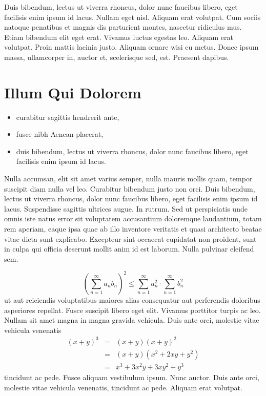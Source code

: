 Duis bibendum, lectus ut viverra rhoncus, dolor nunc faucibus libero, eget facilisis enim ipsum id lacus. Nullam eget nisl. Aliquam erat volutpat. Cum sociis natoque penatibus et magnis dis parturient montes, nascetur ridiculus mus. Etiam bibendum elit eget erat. Vivamus luctus egestas leo. Aliquam erat volutpat. Proin mattis lacinia justo. Aliquam ornare wisi eu metus. Donec ipsum massa, ullamcorper in, auctor et, scelerisque sed, est. Praesent dapibus.

\section{Illum Qui Dolorem}
\begin{itemize}
	\item curabitur sagittis hendrerit ante,
	\item fusce nibh Aenean placerat,
	\item duis bibendum, lectus ut viverra rhoncus, dolor nunc faucibus libero, eget facilisis enim ipsum id lacus.
\end{itemize}
Nulla accumsan, elit sit amet varius semper, nulla mauris mollis quam, tempor suscipit diam nulla vel leo. Curabitur bibendum justo non orci. Duis bibendum, lectus ut viverra rhoncus, dolor nunc faucibus libero, eget facilisis enim ipsum id lacus. Suspendisse sagittis ultrices augue. In rutrum. Sed ut perspiciatis unde omnis iste natus error sit voluptatem accusantium doloremque laudantium, totam rem aperiam, eaque ipsa quae ab illo inventore veritatis et quasi architecto beatae vitae dicta sunt explicabo. Excepteur sint occaecat cupidatat non proident, sunt in culpa qui officia deserunt mollit anim id est laborum. Nulla pulvinar eleifend sem.

\begin{equation}
\left(\sum_{n=1}^{\infty}a_{n}b_{n}\right)^{2} \leq
\sum_{n=1}^{\infty}a_{n}^{2} \cdot \sum_{n=1}^{\infty}b_{n}^{2}
\label{eq:A}
\end{equation}
ut aut reiciendis voluptatibus maiores alias consequatur aut perferendis doloribus asperiores repellat. Fusce suscipit libero eget elit. Vivamus porttitor turpis ac leo. Nullam sit amet magna in magna gravida vehicula. Duis ante orci, molestie vitae vehicula venenatis
\begin{eqnarray}
(x+y)^{3} & = & (x+y)(x+y)^{2}\label{eq:B}\\
          & = & (x+y)(x^{2}+2xy+y^{2})\nonumber\\
          & = & x^{3}+3x^{2}y+3xy^{2}+y^{3}\label{eq:C}
\end{eqnarray}
tincidunt ac pede. Fusce aliquam vestibulum ipsum. Nunc auctor. Duis ante orci, molestie vitae vehicula venenatis, tincidunt ac pede. Aliquam erat volutpat.


